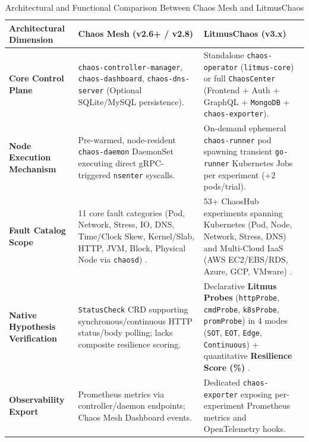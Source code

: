 \begin{table}[!tbp]
\centering
\scriptsize
\setlength{\tabcolsep}{4pt}
\renewcommand{\arraystretch}{1.15}
\caption{Architectural and Functional Comparison Between Chaos Mesh and LitmusChaos}
\label{tab:architectural_comparison}
\begin{tabularx}{\textwidth}{p{2.65cm} X X}
\toprule
\textbf{Architectural Dimension} & \textbf{Chaos Mesh (v2.6+ / v2.8)} & \textbf{LitmusChaos (v3.x)} \\
\midrule
\textbf{Core Control Plane} & \texttt{chaos-controller-manager}, \texttt{chaos-dashboard}, \texttt{chaos-dns-server} (Optional SQLite/MySQL persistence). & Standalone \texttt{chaos-operator} (\texttt{litmus-core}) or full \texttt{ChaosCenter} (Frontend + Auth + GraphQL + \texttt{MongoDB} + \texttt{chaos-exporter}). \\
\textbf{Node Execution Mechanism} & Pre-warmed, node-resident \texttt{chaos-daemon} DaemonSet executing direct gRPC-triggered \texttt{nsenter} syscalls. & On-demand ephemeral \texttt{chaos-runner} pod spawning transient \texttt{go-runner} Kubernetes Jobs per experiment ($+2$ pods/trial). \\
\textbf{Fault Catalog Scope} & 11 core fault categories (Pod, Network, Stress, IO, DNS, Time/Clock Skew, Kernel/Slab, HTTP, JVM, Block, Physical Node via \texttt{chaosd}) \cite{onkalo2025improving}. & 53+ ChaosHub experiments spanning Kubernetes (Pod, Node, Network, Stress, DNS) and Multi-Cloud IaaS (AWS EC2/EBS/RDS, Azure, GCP, VMware) \cite{onkalo2025improving, opara2025chaos}. \\
\textbf{Native Hypothesis Verification} & \texttt{StatusCheck} CRD supporting synchronous/continuous HTTP status/body polling; lacks composite resilience scoring. & Declarative \textbf{Litmus Probes} (\texttt{httpProbe}, \texttt{cmdProbe}, \texttt{k8sProbe}, \texttt{promProbe}) in 4 modes (\texttt{SOT}, \texttt{EOT}, \texttt{Edge}, \texttt{Continuous}) + quantitative \textbf{Resilience Score (\%)} \cite{onkalo2025improving}. \\
\textbf{Observability Export} & Prometheus metrics via controller/daemon endpoints; Chaos Mesh Dashboard events. & Dedicated \texttt{chaos-exporter} exposing per-experiment Prometheus metrics and OpenTelemetry hooks. \\
\bottomrule
\end{tabularx}
\end{table}